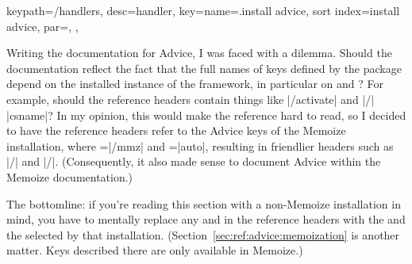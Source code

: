 \documentclass[a4paper,11pt]{article}
\begin{document}
\begin{doc}{
    keypath={/handlers}, desc=handler,
    key={name=.install advice,
      sort index=install advice,
      par=,
    },
  }
  \begin{tcolorbox}[warning]
    Writing the documentation for Advice, I was faced with a dilemma.  Should
    the documentation reflect the fact that the full names of keys defined by
    the package depend on the installed instance of the framework, in
    particular on  and ?  For example, should
    the reference headers contain things like |/activate| and
    |/| |csname|?  In my opinion, this would
    make the reference hard to read, so I decided to have the reference headers
    refer to the Advice keys of the Memoize installation, where
    =|/mmz| and =|auto|, resulting in
    friendlier headers such as |/| and
    |/|.  (Consequently, it also made
    sense to document Advice within the Memoize documentation.)

    The bottomline: if you're reading this section with a non-Memoize
    installation in mind, you have to mentally replace any 
    and  in the reference headers with the  and
    the  selected by that installation.
    (Section~\ref{sec:ref:advice:memoization} is another matter.  Keys
    described there are only available in Memoize.)
  \end{tcolorbox}
  

\end{doc}
\end{document}
